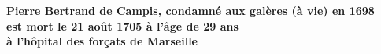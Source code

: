 \vspace{0.55em}

\begin{center}
        \end{center}

\vspace{0.65em}

\begin{center}
\textbf{Pierre Bertrand de Campis, condamné aux galères (à vie) en 1698}\\
\textbf{est mort le 21 août 1705 à l’âge de 29 ans}\\
\textbf{à l’hôpital des forçats de Marseille}
\end{center}

\vfill




